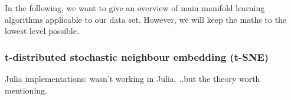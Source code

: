 \documentclass[journal, a4paper]{IEEEtran}
\begin{document}

In the following, we want to give an overview of main manifold learning algorithms applicable to our data set. However, we will keep the maths to the lowest level possible.

\subsubsection{t-distributed stochastic neighbour embedding (t-SNE)}


%
%
% 
%

Julia implementations:
wasn't working in Julia. ..but the theory worth mentioning.
\end{document}
